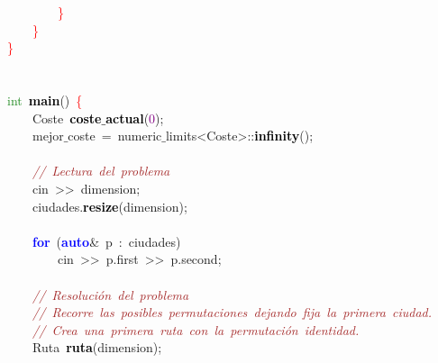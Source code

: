 \mbox{}\ \ \ \ \ \ \ \ \textcolor{Red}{\}} \\
\mbox{}\ \ \ \ \textcolor{Red}{\}} \\
\mbox{}\textcolor{Red}{\}} \\
\mbox{} \\
\mbox{} \\
\mbox{}\textcolor{ForestGreen}{int}\ \textbf{\textcolor{Black}{main}}\textcolor{BrickRed}{()}\ \textcolor{Red}{\{} \\
\mbox{}\ \ \ \ \textcolor{TealBlue}{Coste}\ \textbf{\textcolor{Black}{coste$\_$actual}}\textcolor{BrickRed}{(}\textcolor{Purple}{0}\textcolor{BrickRed}{);} \\
\mbox{}\ \ \ \ mejor$\_$coste\ \textcolor{BrickRed}{=}\ numeric$\_$limits\textcolor{BrickRed}{\textless{}}Coste\textcolor{BrickRed}{\textgreater{}::}\textbf{\textcolor{Black}{infinity}}\textcolor{BrickRed}{();} \\
\mbox{}\ \ \ \  \\
\mbox{}\ \ \ \ \textit{\textcolor{Brown}{//\ Lectura\ del\ problema}} \\
\mbox{}\ \ \ \ cin\ \textcolor{BrickRed}{\textgreater{}\textgreater{}}\ dimension\textcolor{BrickRed}{;} \\
\mbox{}\ \ \ \ ciudades\textcolor{BrickRed}{.}\textbf{\textcolor{Black}{resize}}\textcolor{BrickRed}{(}dimension\textcolor{BrickRed}{);} \\
\mbox{}\ \ \ \  \\
\mbox{}\ \ \ \ \textbf{\textcolor{Blue}{for}}\ \textcolor{BrickRed}{(}\textbf{\textcolor{Blue}{auto}}\textcolor{BrickRed}{\&}\ p\ \textcolor{BrickRed}{:}\ ciudades\textcolor{BrickRed}{)} \\
\mbox{}\ \ \ \ \ \ \ \ cin\ \textcolor{BrickRed}{\textgreater{}\textgreater{}}\ p\textcolor{BrickRed}{.}first\ \textcolor{BrickRed}{\textgreater{}\textgreater{}}\ p\textcolor{BrickRed}{.}second\textcolor{BrickRed}{;} \\
\mbox{}\ \ \ \  \\
\mbox{}\ \ \ \ \textit{\textcolor{Brown}{//\ Resolución\ del\ problema}} \\
\mbox{}\ \ \ \ \textit{\textcolor{Brown}{//\ Recorre\ las\ posibles\ permutaciones\ dejando\ fija\ la\ primera\ ciudad.}} \\
\mbox{}\ \ \ \ \textit{\textcolor{Brown}{//\ Crea\ una\ primera\ ruta\ con\ la\ permutación\ identidad.}} \\
\mbox{}\ \ \ \ \textcolor{TealBlue}{Ruta}\ \textbf{\textcolor{Black}{ruta}}\textcolor{BrickRed}{(}dimension\textcolor{BrickRed}{);} \\
